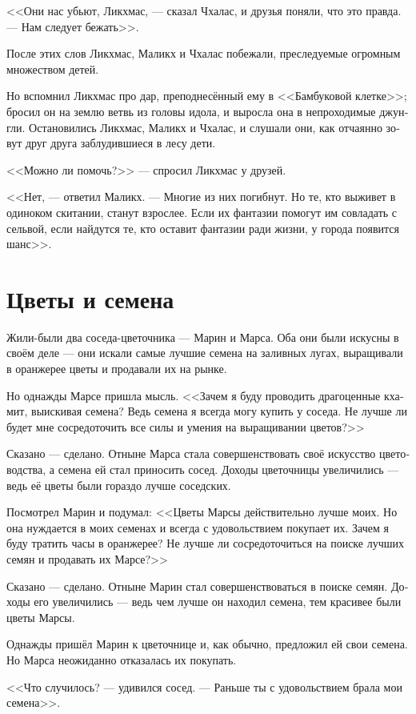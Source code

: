 \documentclass[a4paper,12pt,fleqn]{book}\usepackage{polyglossia}\setdefaultlanguage[babelshorthands=true]{russian}\setotherlanguage{english}\defaultfontfeatures{Ligatures=TeX,Mapping=tex-text}\usepackage{xcolor}\newcommand{\ml}[3]{#2}
\begin{document}
{<<Они нас убьют, Ликхмас, --- сказал Чхалас, и друзья поняли, что это правда.
--- Нам следует бежать>>.

После этих слов Ликхмас, Маликх и Чхалас побежали, преследуемые огромным множеством детей.

Но вспомнил Ликхмас про дар, преподнесённый ему в <<Бамбуковой клетке>>;
бросил он на землю ветвь из головы идола, и выросла она в непроходимые джунгли.
Остановились Ликхмас, Маликх и Чхалас, и слушали они, как отчаянно зовут друг друга заблудившиеся в лесу дети.

<<Можно ли помочь?>> --- спросил Ликхмас у друзей.

<<Нет, --- ответил Маликх.
--- Многие из них погибнут.
Но те, кто выживет в одиноком скитании, станут взрослее.
Если их фантазии помогут им совладать с сельвой, если найдутся те, кто оставит фантазии ради жизни, у города появится шанс>>.

\section{Цветы и семена}

Жили-были два соседа-цветочника --- Марин и Марса.
Оба они были искусны в своём деле --- они искали самые лучшие семена на заливных лугах, выращивали в оранжерее цветы и продавали их на рынке.

Но однажды Марсе пришла мысль.
<<Зачем я буду проводить драгоценные кхамит, выискивая семена?
Ведь семена я всегда могу купить у соседа.
Не лучше ли будет мне сосредоточить все силы и умения на выращивании цветов?>>

Сказано --- сделано.
Отныне Марса стала совершенствовать своё искусство цветоводства, а семена ей стал приносить сосед.
Доходы цветочницы увеличились --- ведь её цветы были гораздо лучше соседских.

Посмотрел Марин и подумал: <<Цветы Марсы действительно лучше моих.
Но она нуждается в моих семенах и всегда с удовольствием покупает их.
Зачем я буду тратить часы в оранжерее?
Не лучше ли сосредоточиться на поиске лучших семян и продавать их Марсе?>>

Сказано --- сделано.
Отныне Марин стал совершенствоваться в поиске семян.
Доходы его увеличились --- ведь чем лучше он находил семена, тем красивее были цветы Марсы.

Однажды пришёл Марин к цветочнице и, как обычно, предложил ей свои семена.
Но Марса неожиданно отказалась их покупать.

<<Что случилось? --- удивился сосед.
--- Раньше ты с удовольствием брала мои семена>>.

}
\end{document}
